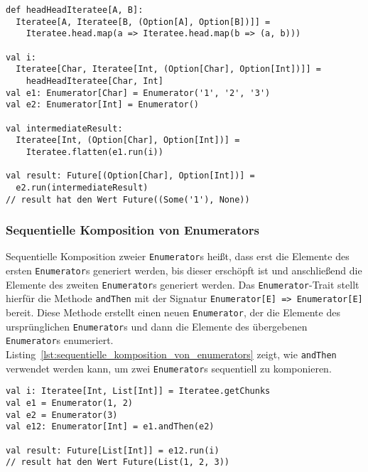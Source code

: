 \begin{lstlisting}[caption=Parallele Komposition von Iteratees mit mehreren Quellen auf eine Senke, label=lst:parallele_komposition_von_iteratees_mit_mehreren_quellen_auf_eine_senke]
def headHeadIteratee[A, B]:
  Iteratee[A, Iteratee[B, (Option[A], Option[B])]] =
    Iteratee.head.map(a => Iteratee.head.map(b => (a, b)))

val i:
  Iteratee[Char, Iteratee[Int, (Option[Char], Option[Int])]] =
    headHeadIteratee[Char, Int]
val e1: Enumerator[Char] = Enumerator('1', '2', '3')
val e2: Enumerator[Int] = Enumerator()

val intermediateResult:
  Iteratee[Int, (Option[Char], Option[Int])] =
    Iteratee.flatten(e1.run(i))

val result: Future[(Option[Char], Option[Int])] =
  e2.run(intermediateResult)
// result hat den Wert Future((Some('1'), None))
\end{lstlisting}


\subsubsection{Sequentielle Komposition von Enumerators} %
\label{ssub:anwendung_sequentielle_komposition_von_enumerators}

\begin{sloppypar} %
Sequentielle Komposition zweier \lstinline|Enumerator|s heißt, dass erst die Elemente des ersten \lstinline|Enumerator|s generiert werden, bis dieser erschöpft ist und anschließend die Elemente des zweiten \lstinline|Enumerator|s generiert werden.
Das \lstinline|Enumerator|-Trait stellt hierfür die Methode \lstinline|andThen| mit der Signatur \lstinline[breaklines=true]|Enumerator[E] => Enumerator[E]| bereit.
Diese Methode erstellt einen neuen \lstinline|Enumerator|, der die Elemente des ursprünglichen \lstinline|Enumerator|s und dann die Elemente des übergebenen \lstinline|Enumerator|s enumeriert.
Listing~\ref{lst:sequentielle_komposition_von_enumerators} zeigt, wie \lstinline|andThen| verwendet werden kann, um zwei \lstinline|Enumerator|s sequentiell zu komponieren.
\end{sloppypar}

\begin{lstlisting}[caption=Sequentielle Komposition von Enumerators, label=lst:sequentielle_komposition_von_enumerators]
val i: Iteratee[Int, List[Int]] = Iteratee.getChunks
val e1 = Enumerator(1, 2)
val e2 = Enumerator(3)
val e12: Enumerator[Int] = e1.andThen(e2)

val result: Future[List[Int]] = e12.run(i)
// result hat den Wert Future(List(1, 2, 3))
\end{lstlisting}

